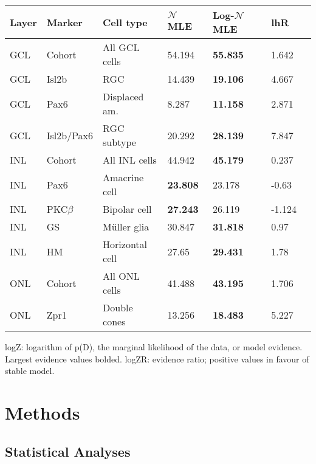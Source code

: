 \begin{table}[!ht]
    \begin{tabular}{|l|l|l|l|l|l|l|} 
        \hline
        {\bf Layer} & {\bf Marker} & {\bf Cell type} & {\bf $\mathcal{N}$ MLE} & {\bf Log-$\mathcal{N}$ MLE} & {\bf lhR}\\ \hline \hline
        GCL & Cohort & All GCL cells & 54.194 & {\bf 55.835} & 1.642\\ \hline
        GCL & Isl2b & RGC & 14.439 & {\bf 19.106} & 4.667\\ \hline
        GCL & Pax6 & Displaced am. &  8.287 & {\bf 11.158} & 2.871\\ \hline
        GCL & Isl2b/Pax6 & RGC subtype & 20.292 & {\bf 28.139} & 7.847\\ \hline
        INL & Cohort & All INL cells & 44.942 & {\bf 45.179} & 0.237\\ \hline
        INL & Pax6 & Amacrine cell & {\bf 23.808} & 23.178 & -0.63\\ \hline
        INL & PKC$\beta$ & Bipolar cell & {\bf 27.243} & 26.119 & -1.124\\ \hline
        INL & GS & M\"{u}ller glia & 30.847 & {\bf 31.818} & 0.97\\ \hline
        INL & HM & Horizontal cell & 27.65 & {\bf 29.431} & 1.78\\ \hline
        ONL & Cohort & All ONL cells & 41.488 & {\bf 43.195} & 1.706\\ \hline
        ONL & Zpr1 & Double cones & 13.256 & {\bf 18.483} & 5.227\\ \hline
    \end{tabular}
   
    \begin{flushleft}logZ: logarithm of p(D), the marginal likelihood of the data, or model evidence.  Largest evidence values bolded. logZR: evidence ratio; positive values in favour of stable model.
    \end{flushleft}
    \label{lineage_lhratio}
\end{table}


\section{Methods}
\label{ssec:CMZmethods}

\subsection{Statistical Analyses}


